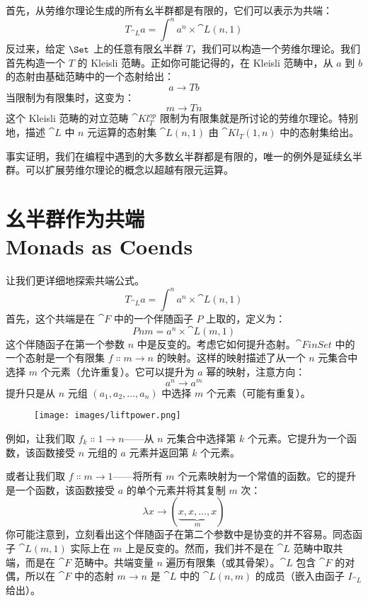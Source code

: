 首先，从劳维尔理论生成的所有幺半群都是有限的，它们可以表示为共端：
\[T_{\cat{L}} a = \int^n a^n \times \cat{L}(n, 1)\]
反过来，给定 $\Set$ 上的任意有限幺半群 $T$，我们可以构造一个劳维尔理论。我们首先构造一个 $T$ 的 Kleisli 范畴。正如你可能记得的，在 Kleisli 范畴中，从 $a$ 到 $b$ 的态射由基础范畴中的一个态射给出：
\[a \to T b\]
当限制为有限集时，这变为：
\[m \to T n\]
这个 Kleisli 范畴的对立范畴 $\cat{Kl}^\mathit{op}_{T}$ 限制为有限集就是所讨论的劳维尔理论。特别地，描述 $\cat{L}$ 中 $n$ 元运算的态射集 $\cat{L}(n, 1)$ 由 $\cat{Kl}_{T}(1, n)$ 中的态射集给出。

事实证明，我们在编程中遇到的大多数幺半群都是有限的，唯一的例外是延续幺半群。可以扩展劳维尔理论的概念以超越有限元运算。

\section{幺半群作为共端\\ \textmd{Monads as Coends}}

让我们更详细地探索共端公式。
\[T_{\cat{L}} a = \int^n a^n \times \cat{L}(n, 1)\]
首先，这个共端是在 $\cat{F}$ 中的一个伴随函子 $P$ 上取的，定义为：
\[P n m = a^n \times \cat{L}(m, 1)\]
这个伴随函子在第一个参数 $n$ 中是反变的。考虑它如何提升态射。$\cat{FinSet}$ 中的一个态射是一个有限集 $f \Colon m \to n$ 的映射。这样的映射描述了从一个 $n$ 元集合中选择 $m$ 个元素（允许重复）。它可以提升为 $a$ 幂的映射，注意方向：
\[a^n \to a^m\]
提升只是从 $n$ 元组 $(a_1, a_2, \ldots{}, a_n)$ 中选择 $m$ 个元素（可能有重复）。

\begin{figure}[H]
  \centering
  \texttt{[image: images/liftpower.png]}
\end{figure}

例如，让我们取 $f_k \Colon 1 \to n$——从 $n$ 元集合中选择第 $k$ 个元素。它提升为一个函数，该函数接受 $n$ 元组的 $a$ 元素并返回第 $k$ 个元素。

或者让我们取 $f \Colon m \to 1$——将所有 $m$ 个元素映射为一个常值的函数。它的提升是一个函数，该函数接受 $a$ 的单个元素并将其复制 $m$ 次：
\[\lambda{}x \to (\underbrace{x, x, \ldots{}, x}_{m})\]
你可能注意到，立刻看出这个伴随函子在第二个参数中是协变的并不容易。同态函子 $\cat{L}(m, 1)$ 实际上在 $m$ 上是反变的。然而，我们并不是在 $\cat{L}$ 范畴中取共端，而是在 $\cat{F}$ 范畴中。共端变量 $n$ 遍历有限集（或其骨架）。$\cat{L}$ 包含 $\cat{F}$ 的对偶，所以在 $\cat{F}$ 中的态射 $m \to n$ 是 $\cat{L}$ 中的 $\cat{L}(n, m)$ 的成员（嵌入由函子 $I_{\cat{L}}$ 给出）。

